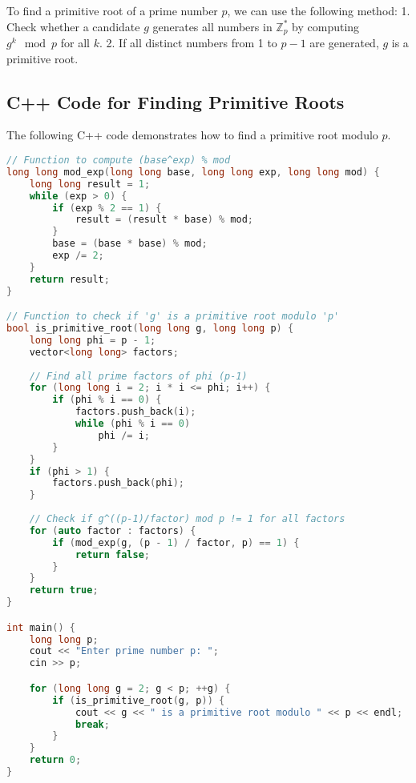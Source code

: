 \documentclass[10pt,a4paper]{article}
\begin{document}
To find a primitive root of a prime number \(p\), we can use the following method:
1. Check whether a candidate \(g\) generates all numbers in \( \mathbb{Z}_p^* \) by computing \(g^k \mod p\) for all \(k\).
2. If all distinct numbers from 1 to \(p-1\) are generated, \(g\) is a primitive root.

\subsection*{C++ Code for Finding Primitive Roots}

The following C++ code demonstrates how to find a primitive root modulo \(p\).

\begin{lstlisting}[language=C++]
// Function to compute (base^exp) % mod
long long mod_exp(long long base, long long exp, long long mod) {
    long long result = 1;
    while (exp > 0) {
        if (exp % 2 == 1) {
            result = (result * base) % mod;
        }
        base = (base * base) % mod;
        exp /= 2;
    }
    return result;
}

// Function to check if 'g' is a primitive root modulo 'p'
bool is_primitive_root(long long g, long long p) {
    long long phi = p - 1;
    vector<long long> factors;
    
    // Find all prime factors of phi (p-1)
    for (long long i = 2; i * i <= phi; i++) {
        if (phi % i == 0) {
            factors.push_back(i);
            while (phi % i == 0)
                phi /= i;
        }
    }
    if (phi > 1) {
        factors.push_back(phi);
    }
    
    // Check if g^((p-1)/factor) mod p != 1 for all factors
    for (auto factor : factors) {
        if (mod_exp(g, (p - 1) / factor, p) == 1) {
            return false;
        }
    }
    return true;
}

int main() {
    long long p;
    cout << "Enter prime number p: ";
    cin >> p;

    for (long long g = 2; g < p; ++g) {
        if (is_primitive_root(g, p)) {
            cout << g << " is a primitive root modulo " << p << endl;
            break;
        }
    }
    return 0;
}
\end{lstlisting}
\end{document}
